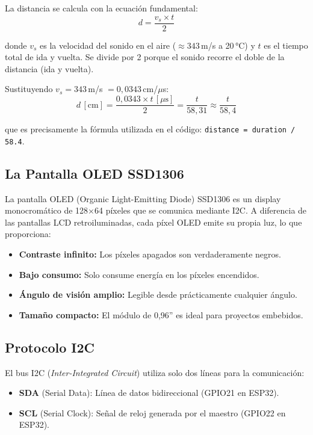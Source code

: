 \documentclass[12pt,a4paper]{article}
\begin{document}
La distancia se calcula con la ecuación fundamental:
\begin{equation}
d = \frac{v_s \times t}{2}
\label{eq:fisica}
\end{equation}

donde $v_s$ es la velocidad del sonido en el aire ($\approx 343$\,m/s a 20\,°C) y $t$ es el tiempo total de ida y vuelta. Se divide por 2 porque el sonido recorre el doble de la distancia (ida y vuelta).

Sustituyendo $v_s = 343$\,m/s $= 0{,}0343$\,cm/$\mu$s:
\begin{equation}
d\,[\text{cm}] = \frac{0{,}0343 \times t\,[\mu\text{s}]}{2} = \frac{t}{58{,}31} \approx \frac{t}{58{,}4}
\end{equation}

que es precisamente la fórmula utilizada en el código: \texttt{distance = duration / 58.4}.

\subsection{La Pantalla OLED SSD1306}

La pantalla OLED (Organic Light-Emitting Diode) SSD1306 es un display monocromático de 128$\times$64 píxeles que se comunica mediante I2C. A diferencia de las pantallas LCD retroiluminadas, cada píxel OLED emite su propia luz, lo que proporciona:

\begin{itemize}
    \item \textbf{Contraste infinito:} Los píxeles apagados son verdaderamente negros.
    \item \textbf{Bajo consumo:} Solo consume energía en los píxeles encendidos.
    \item \textbf{Ángulo de visión amplio:} Legible desde prácticamente cualquier ángulo.
    \item \textbf{Tamaño compacto:} El módulo de 0,96'' es ideal para proyectos embebidos.
\end{itemize}

\subsection{Protocolo I2C}

El bus I2C (\textit{Inter-Integrated Circuit}) utiliza solo dos líneas para la comunicación:
\begin{itemize}
    \item \textbf{SDA} (Serial Data): Línea de datos bidireccional (GPIO21 en ESP32).
    \item \textbf{SCL} (Serial Clock): Señal de reloj generada por el maestro (GPIO22 en ESP32).
\end{itemize}
\end{document}
